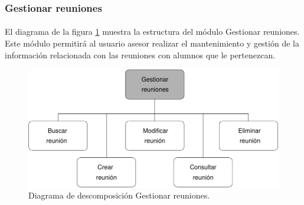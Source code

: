 \subsubsection{Gestionar reuniones}

  \paragraph{}El diagrama de la figura
  \ref{diagramaDescomposicionGestionarReuniones} muestra la
  estructura del módulo Gestionar reuniones. Este módulo permitirá al
  usuario asesor realizar el mantenimiento y gestión de la
  información relacionada con las reuniones con alumnos que le pertenezcan.

  \begin{figure}[!ht]
    \begin{center}
      \includegraphics[]{11.Disenyo_Arquitectonico/11.2.Diagramas_Descomposicion/11.2.4.Modulo_asesores/AdministrarBBDD/GestionarReuniones/Diagramas/gestionar_reuniones.pdf}
      \caption{Diagrama de descomposición Gestionar reuniones.}
      \label{diagramaDescomposicionGestionarReuniones}
    \end{center}
  \end{figure}
